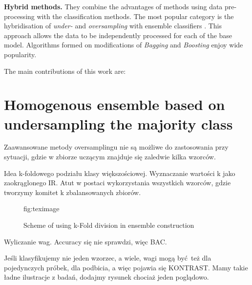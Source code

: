 \documentclass[pmlr]{jmlr}
\begin{document}
\noindent\textbf{Hybrid methods.} They combine the advantages of methods using data pre-processing with the classification methods. The most popular category is the hybridisation of \emph{under-} and \emph{oversampling} with ensemble classifiers \cite{Galar:2012}. This approach allows the data to be independently  processed for each of the base model. Algorithms formed on modifications of \emph{Bagging} and \emph{Boosting} \cite{Chawla:2003} enjoy wide popularity.

The main contributions of this work are:

\section{Homogenous ensemble based on undersampling the majority class}
\label{sec:intro}

Zaawansowane metody oversamplingu nie są możliwe do zastosowania przy sytuacji, gdzie w zbiorze uczącym znajduje się zaledwie kilka wzorców.

Idea k-foldowego podziału klasy większościowej. Wyznaczanie wartości k jako zaokrąglonego IR. Atut w postaci wykorzystania wszystkich wzorców, gdzie tworzymy komitet k zbalansowanych zbiorów.

\begin{figure}[!h]
\floatconts
  {fig:teximage}
  {\caption{Scheme of using k-Fold division in ensemble construction}}
  {}
\end{figure}

Wyliczanie wag. Accuracy się nie sprawdzi, więc BAC.

Jeśli klasyfikujemy nie jeden wzorzec, a wiele, wagi mogą być też dla pojedynczych próbek, dla podbicia, a więc pojawia się KONTRAST. Mamy takie ładne ilustracje z badań, dodajmy rysunek chociaż jeden poglądowo.
\end{document}
